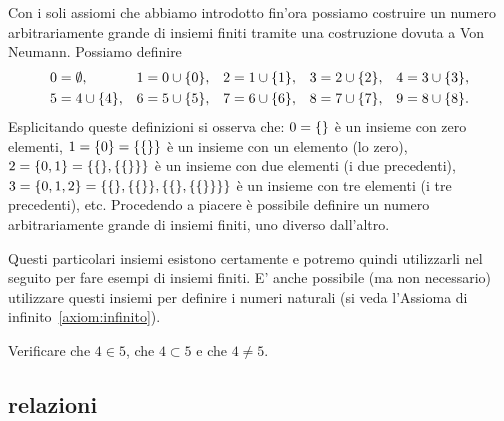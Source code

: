 Con i soli assiomi che abbiamo introdotto fin'ora possiamo 
costruire un numero arbitrariamente grande di insiemi finiti
tramite una costruzione dovuta a Von Neumann. 
Possiamo definire 
\begin{equation}\label{eq:vonNeumann}
  \begin{aligned}
  0&=\emptyset, &
  1&=0\cup{\left\{ 0 \right\}}, &
  2&=1\cup{\left\{ 1 \right\}}, &
  3&=2\cup{\left\{ 2 \right\}}, &
  4&=3\cup{\left\{ 3 \right\}},\\
  5&=4\cup{\left\{ 4 \right\}}, &
  6&=5\cup{\left\{ 5 \right\}}, &
  7&=6\cup{\left\{ 6 \right\}}, &
  8&=7\cup{\left\{ 7 \right\}}, &
  9&=8\cup{\left\{ 8 \right\}}.
  \end{aligned}
\end{equation}
Esplicitando queste definizioni si osserva che:
$0={\left\{  \right\}}$ è un insieme con zero elementi, 
$1={\left\{ 0 \right\}}={\left\{ {\left\{  \right\}} \right\}}$ è un insieme con un elemento (lo zero),
$2={\left\{ 0,1 \right\}}={\left\{ {\left\{  \right\}},{\left\{ {\left\{  \right\}} \right\}} \right\}}$ è un insieme con due elementi (i due precedenti), 
$3={\left\{ 0,1,2 \right\}}={\left\{ {\left\{  \right\}},{\left\{ {\left\{  \right\}} \right\}},{\left\{ {\left\{  \right\}},{\left\{ {\left\{  \right\}} \right\}} \right\}} \right\}}$ 
è un insieme con tre elementi (i tre precedenti),
etc.
Procedendo a piacere è possibile definire un numero arbitrariamente 
grande di insiemi finiti, uno diverso dall'altro.

Questi particolari insiemi esistono certamente e potremo quindi utilizzarli 
nel seguito per fare esempi di insiemi finiti.
E' anche possibile (ma non necessario) utilizzare questi insiemi 
per definire i numeri naturali (si veda l'Assioma di infinito~\ref{axiom:infinito}).

\begin{exercise}
Verificare che $4\in 5$, 
che $4\subset 5$ 
e che $4\neq 5$.
\end{exercise}

\subsection{relazioni}

